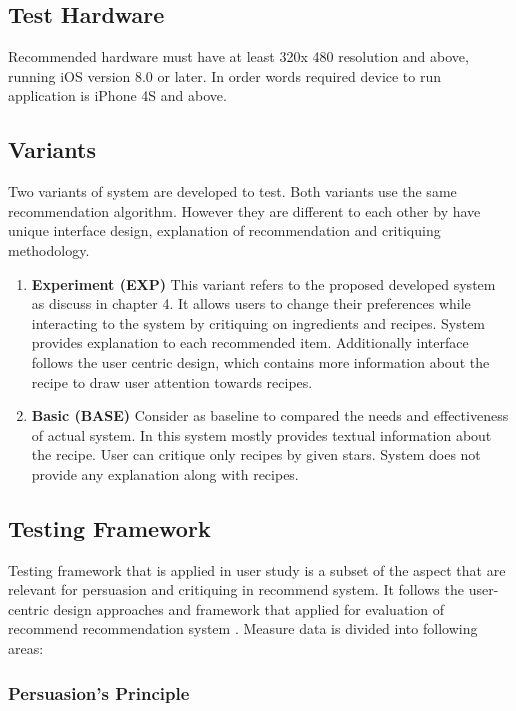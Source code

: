 \subsection{Test Hardware}

Recommended hardware must have at least 320x 480 resolution and above, running iOS version 8.0 or later. In order words required device to run application is iPhone 4S and above.  

\subsection{Variants}

Two variants of system are developed to test. Both variants use the same recommendation algorithm. However they are different to each other by have unique interface design, explanation of recommendation and critiquing methodology. 

\begin{enumerate}
	\item \textbf{Experiment (EXP)} This variant refers to the proposed developed system as discuss in chapter 4. It allows users to change their preferences while interacting to the system by critiquing on ingredients and recipes. System provides explanation to each recommended item. Additionally interface follows the user centric design, which contains more information about the recipe to draw user attention towards recipes.
	
	\item \textbf{Basic (BASE)}  Consider as baseline to compared the needs and effectiveness of actual system. In this system mostly provides textual information about the recipe. User can critique only recipes by given stars. System does not provide any explanation along with recipes. 
\end{enumerate}

\subsection{Testing Framework}

Testing framework that is applied in user study is a subset of the aspect that are relevant for persuasion and critiquing in recommend system. It follows the user-centric design approaches \cite{pu2006trust} and framework that applied for evaluation of recommend recommendation system \cite{shani2011evaluating}. Measure data is divided into following areas:

\subsubsection{Persuasion’s Principle}


